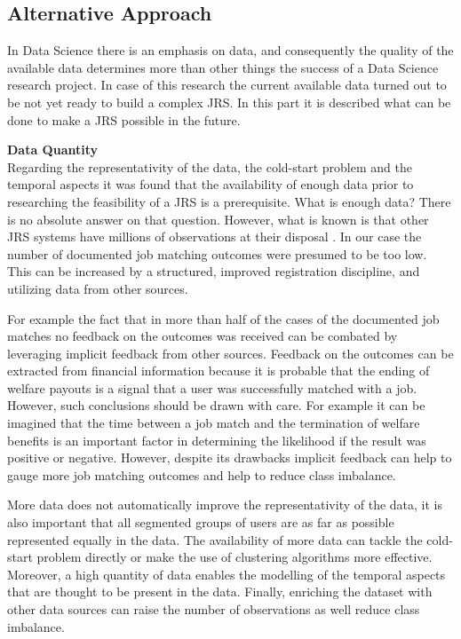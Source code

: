 \subsection{Alternative Approach}
\label{ssec:learnings}

In Data Science there is an emphasis on data, and consequently the quality of the available data determines more than other things the success of a Data Science research project.
In case of this research the current available data turned out to be not yet ready to build a complex JRS. 
In this part it is described what can be done to make a JRS possible in the future.

\noindent
\textbf{Data Quantity}\\
Regarding the representativity of the data, the cold-start problem and the temporal aspects it was found that the availability of enough data prior to researching the feasibility of a JRS is a prerequisite.
What is enough data?
There is no absolute answer on that question. 
However, what is known is that other JRS systems have millions of observations at their disposal \cite{kenthapadi2017personalized, T.Al-Otaibi2012ASystems, Zheng2012JobSurvey, hong2013job}.
In our case the number of documented job matching outcomes were presumed to be too low. 
This can be increased by a structured, improved registration discipline, and utilizing data from other sources.

For example the fact that in more than half of the cases of the documented job matches no feedback on the outcomes was received can be combated by leveraging implicit feedback from other sources.
Feedback on the outcomes can be extracted from financial information because it is probable that the ending of welfare payouts is a signal that a user was successfully matched with a job. 
However, such conclusions should be drawn with care.
For example it can be imagined that the time between a job match and the termination of welfare benefits is an important factor in determining the likelihood if the result was positive or negative. 
However, despite its drawbacks implicit feedback can help to gauge more job matching outcomes and help to reduce class imbalance.

More data does not automatically improve the representativity of the data, it is also important that all segmented groups of users are as far as possible represented equally in the data.
The availability of more data can tackle the cold-start problem directly or make the use of clustering algorithms more effective. 
Moreover, a high quantity of data enables the modelling of the temporal aspects that are thought to be present in the data.
Finally, enriching the dataset with other data sources can raise the number of observations as well reduce class imbalance.

